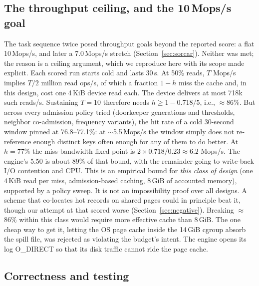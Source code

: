 \documentclass{article}
\newcommand{\HydraFinalWL}{5.50}        %
\newcommand{\MemBudget}{8\,GiB}
\newcommand{\FioIops}{718k}
\newcommand{\HitRate}{77\%}
\newcommand{\HitNeeded}{$\approx$86\%}
\begin{document}
\subsection{The throughput ceiling, and the 10\,Mops/s goal}
\label{sec:ceiling}

The task sequence twice posed throughput goals beyond the reported score: a flat 10\,Mops/s, and later a 7.0\,Mops/s stretch (Section~\ref{sec:sorcar}). Neither was met; the reason is a ceiling argument, which we reproduce here with its scope made explicit. Each scored run starts cold and lasts 30\,s. At 50\% reads, $T$ Mops/s implies $T/2$ million read ops/s, of which a fraction $1-h$ miss the cache and, in this design, cost one 4\,KiB device read each. The device delivers at most \FioIops{} such reads/s. Sustaining $T{=}10$ therefore needs $h \geq 1 - 0.718/5$, i.e., \HitNeeded. But across every admission policy tried (doorkeeper generations and thresholds, neighbor co-admission, frequency variants), the hit rate of a cold 30-second window pinned at 76.8--77.1\%: at $\sim$5.5\,Mops/s the window simply does not re-reference enough distinct keys often enough for any of them to do better. At $h{=}\HitRate$ the miss-bandwidth fixed point is $2 \times 0.718/0.23 \approx 6.2$ Mops/s. The engine's \HydraFinalWL{} is about 89\% of that bound, with the remainder going to write-back I/O contention and CPU. This is an empirical bound for \emph{this class of design} (one 4\,KiB read per miss, admission-based caching, \MemBudget{} of accounted memory), supported by a policy sweep. It is not an impossibility proof over all designs. A scheme that co-locates hot records on shared pages could in principle beat it, though our attempt at that scored worse (Section~\ref{sec:negative}). Breaking \HitNeeded{} within this class would require more effective cache than \MemBudget. The one cheap way to get it, letting the OS page cache inside the 14\,GiB cgroup absorb the spill file, was rejected as violating the budget's intent. The engine opens its log O\_DIRECT so that its disk traffic cannot ride the page cache.

\subsection{Correctness and testing}
\label{sec:testing}
\end{document}
